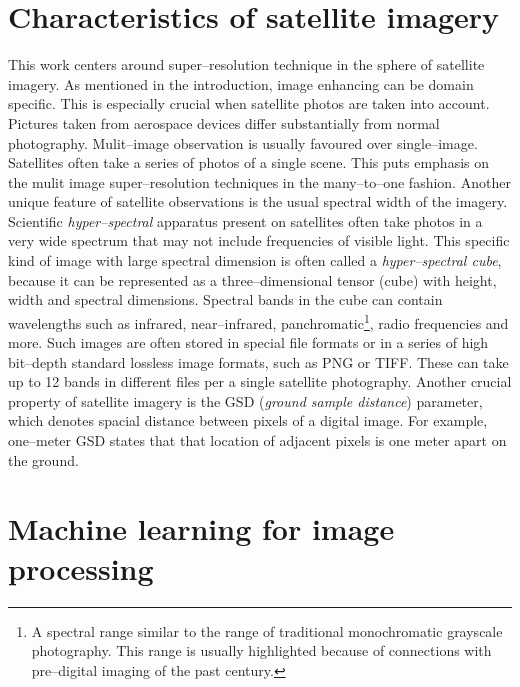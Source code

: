 \section{Characteristics of satellite imagery}
This work centers around super--resolution technique in the sphere of satellite imagery.
As mentioned in the introduction, image enhancing can be domain specific.
This is especially crucial when satellite photos are taken into account.
Pictures taken from aerospace devices differ substantially from normal photography.
Mulit--image observation is usually favoured over single--image.
Satellites often take a series of photos of a single scene.
This puts emphasis on the mulit image super--resolution techniques in the many--to--one fashion.
Another unique feature of satellite observations is the usual spectral width of the imagery.
Scientific \textit{hyper--spectral} apparatus present on satellites often take photos in a very wide spectrum that may not include frequencies of visible light.
This specific kind of image with large spectral dimension is often called a \textit{hyper--spectral cube}, because it can be represented as a three--dimensional tensor (cube) with height, width and spectral dimensions.
Spectral bands in the cube can contain wavelengths such as infrared, near--infrared, panchromatic\footnote{A spectral range similar to the range of traditional monochromatic grayscale photography. This range is usually highlighted because of connections with pre--digital imaging of the past century.}, radio frequencies and more.
Such images are often stored in special file formats or in a series of high bit--depth standard lossless image formats, such as PNG or TIFF.
These can take up to 12 bands in different files per a single satellite photography.
Another crucial property of satellite imagery is the GSD (\textit{ground sample distance}) parameter, which denotes spacial distance between pixels of a digital image.
For example, one--meter GSD states that that location of adjacent pixels is one meter apart on the ground.

\section{Machine learning for image processing}
